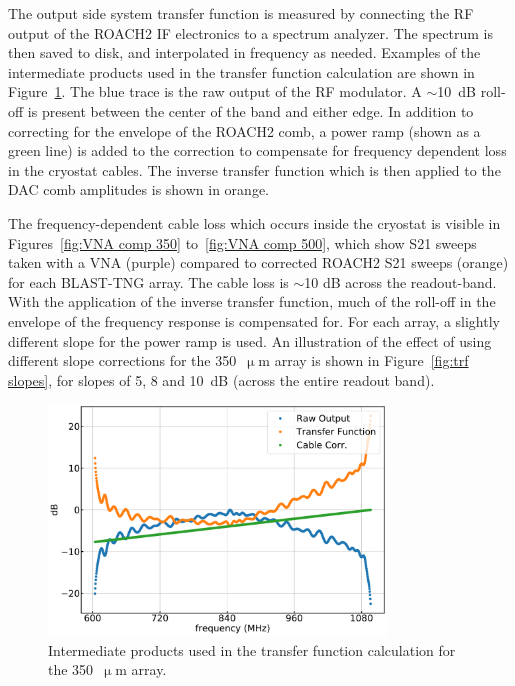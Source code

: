 The output side system transfer function is measured by connecting the RF output of the ROACH2 IF electronics to a spectrum analyzer. The spectrum is then saved to disk, and interpolated in frequency as needed. Examples of the intermediate products used in the transfer function calculation are shown in Figure~\ref{fig:350 TRF}. The blue trace is the raw output of the RF modulator. A $\sim$10~dB roll-off is present between the center of the band and either edge. In addition to correcting for the envelope of the ROACH2 comb, a power ramp (shown as a green line) is added to the correction to compensate for frequency dependent loss in the cryostat cables. The inverse transfer function which is then applied to the DAC comb amplitudes is shown in orange.

The frequency-dependent cable loss which occurs inside the cryostat is visible in Figures~\ref{fig:VNA comp 350} to~\ref{fig:VNA comp 500}, which show \gls{S21} sweeps taken with a VNA (purple) compared to corrected ROACH2 \gls{S21} sweeps (orange) for each BLAST-TNG array. The cable loss is $\sim$10 dB across the readout-band. With the application of the inverse transfer function, much of the roll-off in the envelope of the frequency response is compensated for. For each array, a slightly different slope for the power ramp is used. An illustration of the effect of using different slope corrections for the 350~$\upmu$m array is shown in Figure~\ref{fig:trf slopes}, for slopes of 5, 8 and 10~dB (across the entire readout band).

\begin{figure}[!htbp]
\centering
\includegraphics[width=0.8\textwidth]{figures/blast_data/sweeps/r3_transfunc}
\caption[~Intermediate products used in the transfer function calculation for the  array.]{Intermediate products used in the transfer function calculation for the 350~$\upmu$m array.}
\label{fig:350 TRF}
\end{figure}

